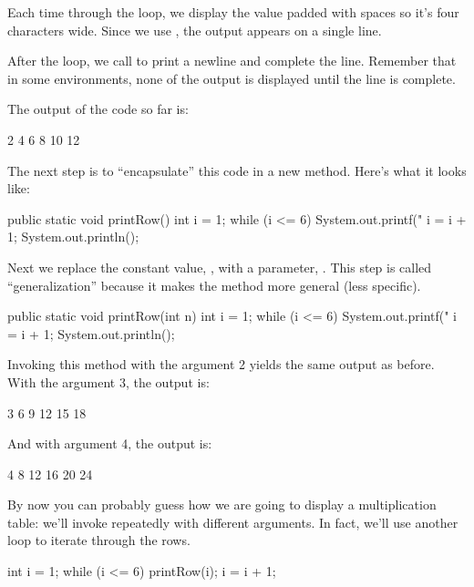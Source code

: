 Each time through the loop, we display the value  padded with spaces so it's four characters wide.
Since we use , the output appears on a single line.

After the loop, we call  to print a newline and complete the line.
Remember that in some environments, none of the output is displayed until the line is complete.

The output of the code so far is:

\begin{stdout}
   2   4   6   8  10  12
\end{stdout}

The next step is to ``encapsulate'' this code in a new method.
Here's what it looks like:

\begin{code}
public static void printRow() {
    int i = 1;
    while (i <= 6) {
        System.out.printf("%
        i = i + 1;
    }
    System.out.println();
}
\end{code}


Next we replace the constant value, , with a parameter, .
This step is called ``generalization'' because it makes the method more general (less specific).

\begin{code}
public static void printRow(int n) {
    int i = 1;
    while (i <= 6) {
        System.out.printf("%
        i = i + 1;
    }
    System.out.println();
}
\end{code}

Invoking this method with the argument 2 yields the same output as before.
With the argument 3, the output is:

\begin{stdout}
   3   6   9  12  15  18
\end{stdout}

And with argument 4, the output is:

\begin{stdout}
   4   8  12  16  20  24
\end{stdout}

By now you can probably guess how we are going to display a multiplication table: we'll invoke  repeatedly with different arguments.
In fact, we'll use another loop to iterate through the rows.

\begin{code}
int i = 1;
while (i <= 6) {
    printRow(i);
    i = i + 1;
}
\end{code}

